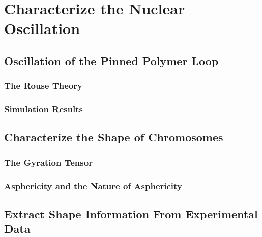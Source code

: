 \chapter{Characterize the Nuclear Oscillation}
\graphicspath{{Chapter5/Figs/}}

\section{Oscillation of the Pinned Polymer Loop}
\label{sec:oscillation_of_the_pinned_polymer_loop}

\subsection{The Rouse Theory}
\label{sub:the_rouse_theory}

\subsection{Simulation Results}
\label{sub:simulation_results}




\section{Characterize the Shape of Chromosomes}
\label{sec:characterize_the_shape_of_chromosomes}

\subsection{The Gyration Tensor}
\label{sub:the_gyration_tensor}

\subsection{Asphericity and the Nature of Asphericity}
\label{sub:asphericity_and_the_nature_of_asphericity}




\section{Extract Shape Information From Experimental Data}
\label{sec:extract_shape_information_from_experimental_data}

